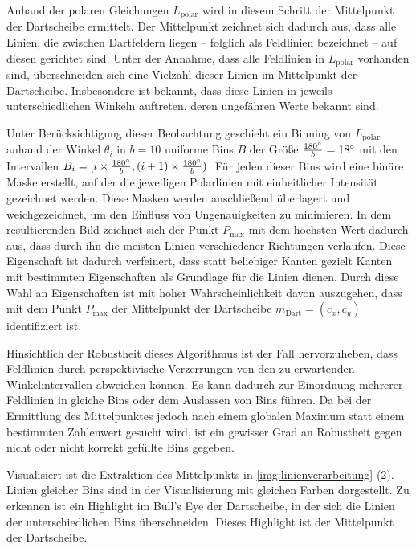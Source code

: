 Anhand der polaren Gleichungen $L_\text{polar}$ wird in diesem Schritt der Mittelpunkt der Dartscheibe ermittelt. Der Mittelpunkt zeichnet sich dadurch aus, dass alle Linien, die zwischen Dartfeldern liegen -- folglich als Feldlinien bezeichnet -- auf diesen gerichtet sind. Unter der Annahme, dass alle Feldlinien in $L_\text{polar}$ vorhanden sind, überschneiden sich eine Vielzahl dieser Linien im Mittelpunkt der Dartscheibe. Insbesondere ist bekannt, dass diese Linien in jeweils unterschiedlichen Winkeln auftreten, deren ungefähren Werte bekannt sind.

Unter Berücksichtigung dieser Beobachtung geschieht ein Binning von $L_\text{polar}$ anhand der Winkel $\theta_i$ in $b=10$ uniforme Bins $B$ der Größe $\frac{180^{\circ}}{b}=18^{\circ}$ mit den Intervallen $ B_i = [i \times \frac{180^{\circ}}{b}, (i+1) \times \frac{180^{\circ}}{b})$. Für jeden dieser Bins wird eine binäre Maske erstellt, auf der die jeweiligen Polarlinien mit einheitlicher Intensität gezeichnet werden. Diese Masken werden anschließend überlagert und weichgezeichnet, um den Einfluss von Ungenauigkeiten zu minimieren. In dem resultierenden Bild zeichnet sich der Punkt $P_\text{max}$ mit dem höchsten Wert dadurch aus, dass durch ihn die meisten Linien verschiedener Richtungen verlaufen. Diese Eigenschaft ist dadurch verfeinert, dass statt beliebiger Kanten gezielt Kanten mit bestimmten Eigenschaften als Grundlage für die Linien dienen. Durch diese Wahl an Eigenschaften ist mit hoher Wahrscheinlichkeit davon auszugehen, dass mit dem Punkt $P_\text{max}$ der Mittelpunkt der Dartscheibe $m_\text{Dart}=(c_x, c_y)$ identifiziert ist.

Hinsichtlich der Robustheit dieses Algorithmus ist der Fall hervorzuheben, dass Feldlinien durch perspektivische Verzerrungen von den zu erwartenden Winkelintervallen abweichen können. Es kann dadurch zur Einordnung mehrerer Feldlinien in gleiche Bins oder dem Auslassen von Bins führen. Da bei der Ermittlung des Mittelpunktes jedoch nach einem globalen Maximum statt einem bestimmten Zahlenwert gesucht wird, ist ein gewisser Grad an Robustheit gegen nicht oder nicht korrekt gefüllte Bins gegeben.

Visualisiert ist die Extraktion des Mittelpunkts in \autoref{img:linienverarbeitung} (2). Linien gleicher Bins sind in der Visualisierung mit gleichen Farben dargestellt. Zu erkennen ist ein Highlight im Bull's Eye der Dartscheibe, in der sich die Linien der unterschiedlichen Bins überschneiden. Dieses Highlight ist der Mittelpunkt der Dartscheibe.

